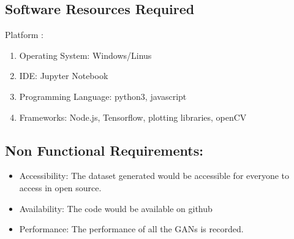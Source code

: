 \documentclass[oneside,a4paper,12pt]{report}
\begin{document}


\pagebreak

\subsection{Software Resources Required}
Platform :
\begin{enumerate}
\item Operating System: Windows/Linus
\item IDE: Jupyter Notebook
\item Programming Language: python3, javascript
\item Frameworks: Node.js, Tensorflow, plotting libraries, openCV
\end{enumerate}


\subsection{Non Functional Requirements:}
\begin{itemize}
  \item Accessibility: The dataset generated would be accessible for everyone to access in open source.
	\item	Availability: The code would be available on github
  \item Performance: The performance of all the GANs is recorded.
\end{itemize}
\end{document}
